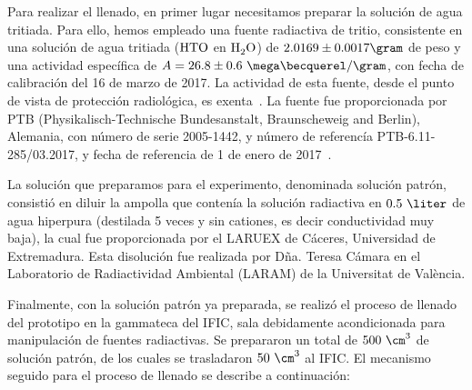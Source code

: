 Para realizar el llenado, en primer lugar necesitamos preparar la solución de agua tritiada. Para ello, hemos  empleado una fuente radiactiva de tritio, consistente en  una solución de agua tritiada ($\ce{HTO}$ en $\ce{H_2O}$) de $2.0169 \pm 0.0017\gram$ de peso y una actividad específica de $A=26.8 \pm 0.6~\mega\becquerel/\gram$, con fecha de calibración del 16 de marzo de 2017. La actividad de esta fuente, desde el punto de vista de protección radiológica,  es  exenta~\cite{IFIC}. La fuente fue proporcionada por PTB (Physikalisch-Technische Bundesanstalt, Braunscheweig and Berlin), Alemania, con número de serie 2005-1442, y número de referencía PTB-6.11-285/03.2017, y fecha de referencia de 1 de enero de 2017~\cite{IFIC}.

La solución que preparamos para el experimento, denominada solución patrón, consistió en diluir la ampolla que contenía la solución radiactiva en  $0.5~\liter$ de agua hiperpura (destilada 5 veces y sin cationes, es decir conductividad muy baja), la cual fue proporcionada por el LARUEX de Cáceres, Universidad de Extremadura. Esta disolución fue realizada por Dña. Teresa Cámara en el Laboratorio de Radiactividad Ambiental (LARAM) de la Universitat de València.



Finalmente, con la solución patrón ya preparada, se realizó el proceso de llenado del prototipo en la gammateca del IFIC, sala debidamente acondicionada para manipulación de fuentes radiactivas. Se prepararon un total de $500~\cm^3$ de solución patrón, de los cuales se trasladaron $50~\cm^3$ al IFIC.
El mecanismo seguido para el proceso de llenado se describe a continuación:

